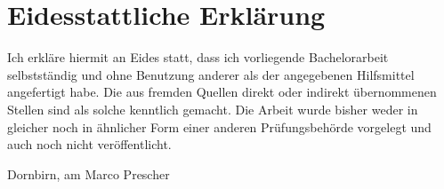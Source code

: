 \documentclass[a4paper, fontsize=11pt, parskip=half, twoside]{scrreprt}
\begin{document}
	\clearpage
	\printbibliography
	
	\clearpage
	\section*{Eidesstattliche Erklärung}
	Ich erkläre hiermit an Eides statt, dass ich vorliegende Bachelorarbeit selbstständig und ohne Benutzung anderer als der angegebenen Hilfsmittel angefertigt habe. 
	Die aus fremden Quellen direkt oder indirekt übernommenen Stellen sind als solche kenntlich gemacht. 
	Die Arbeit wurde bisher weder in gleicher noch in ähnlicher Form einer anderen Prüfungsbehörde vorgelegt und auch noch nicht veröffentlicht.
	
	\vspace{3cm}
	\noindent
	Dornbirn, am  \hfill Marco Prescher
	
	
\end{document}
